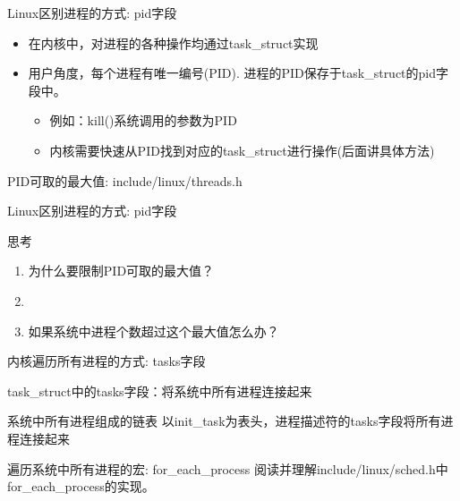 \documentclass[xcolor=svgnames]{beamer}
\begin{document}
\begin{CJK*}{UTF8}{gbsn}
\begin{frame}{Linux区别进程的方式: pid字段}
\begin{itemize}
\item 在内核中，对进程的各种操作均通过task\_struct实现
\item 用户角度，每个进程有唯一编号(PID). 进程的PID保存于task\_struct的pid字段中。
\begin{itemize}
\item 例如：kill()系统调用的参数为PID
\item 内核需要快速从PID找到对应的task\_struct进行操作(后面讲具体方法)
\end{itemize}
\end{itemize}
\begin{block}{PID可取的最大值: include/linux/threads.h}
\lstpidmax
\end{block}
\end{frame}

\begin{frame}{Linux区别进程的方式: pid字段}
\begin{block}{思考}
\begin{enumerate}
\item 为什么要限制PID可取的最大值？
\item[]
\item 如果系统中进程个数超过这个最大值怎么办？
\end{enumerate}
\end{block}
\end{frame}


\begin{frame}{内核遍历所有进程的方式: tasks字段}
\begin{block}{task\_struct中的tasks字段：将系统中所有进程连接起来} 
\lsttasks
\end{block}
\begin{block}{系统中所有进程组成的链表}
以init\_task为表头，进程描述符的tasks字段将所有进程连接起来
\end{block}
\begin{block}{遍历系统中所有进程的宏: for\_each\_process}
阅读并理解include/linux/sched.h中for\_each\_process的实现。
\end{block}
\end{frame}


\end{CJK*}
\end{document}
